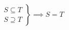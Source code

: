 \documentclass[nofonts]{ctexart}
\begin{document}
\[
	\left.
	\begin{gathered}
		S \subseteq T	\\
		S \supseteq T
	\end{gathered}
	\right\}
	\implies S=T
\]
\end{document}
